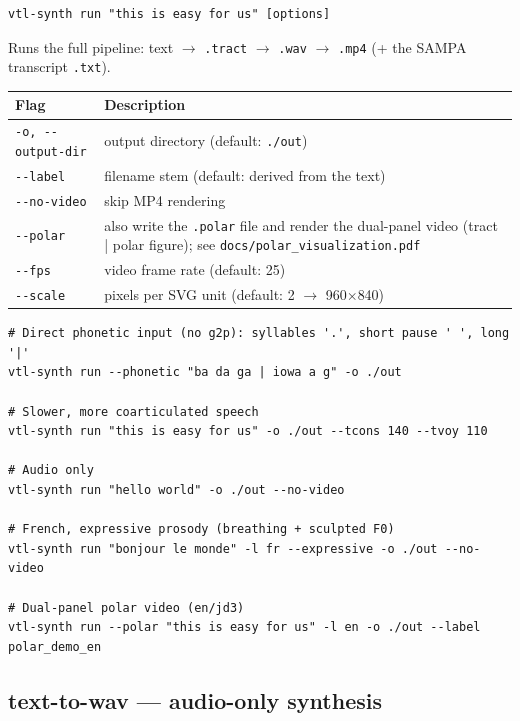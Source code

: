 \documentclass[11pt,a4paper]{article}
\begin{document}
\begin{lstlisting}[style=shell]
vtl-synth run "this is easy for us" [options]
\end{lstlisting}

Runs the full pipeline: text \(\to\) \texttt{.tract} \(\to\) \texttt{.wav}
\(\to\) \texttt{.mp4} (+ the SAMPA transcript \texttt{.txt}).

\begin{center}
\small
\begin{tabularx}{\textwidth}{lX}
\toprule
\textbf{Flag} & \textbf{Description} \\
\midrule
\texttt{-o, -{}-output-dir} & output directory (default: \texttt{./out}) \\
\texttt{-{}-label}          & filename stem (default: derived from the text) \\
\texttt{-{}-no-video}       & skip MP4 rendering \\
\texttt{-{}-polar}          & also write the \texttt{.polar} file and render the dual-panel video (tract | polar figure); see \texttt{docs/polar\_visualization.pdf} \\
\texttt{-{}-fps}            & video frame rate (default: 25) \\
\texttt{-{}-scale}          & pixels per SVG unit (default: 2 \(\to\) 960\(\times\)840) \\
\bottomrule
\end{tabularx}
\end{center}

\begin{lstlisting}[style=shell]
# Direct phonetic input (no g2p): syllables '.', short pause ' ', long '|'
vtl-synth run --phonetic "ba da ga | iowa a g" -o ./out

# Slower, more coarticulated speech
vtl-synth run "this is easy for us" -o ./out --tcons 140 --tvoy 110

# Audio only
vtl-synth run "hello world" -o ./out --no-video

# French, expressive prosody (breathing + sculpted F0)
vtl-synth run "bonjour le monde" -l fr --expressive -o ./out --no-video

# Dual-panel polar video (en/jd3)
vtl-synth run --polar "this is easy for us" -l en -o ./out --label polar_demo_en
\end{lstlisting}

\subsection{text-to-wav --- audio-only synthesis}
\end{document}
